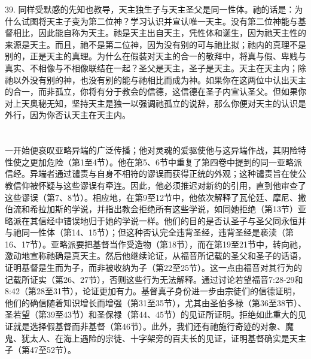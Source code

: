 39. 同样受默感的先知也教导，天主独生子与天主圣父是同一性体。祂的话是：为什么试图将天主子变为第二位神？学习认识并宣认唯一天主。没有第二位神能与基督相比，因此能自称为天主。祂是天主出自天主，凭性体和诞生，因为祂天主性的来源是天主。而且，祂不是第二位神，因为没有别的可与祂比拟；祂内的真理不是别的，正是天主的真理。为什么在假装对天主的合一的敬拜中，将真与假、卑贱与真实、不相像与不相像联结在一起？圣父是天主，圣子是天主。天主在天主内；除祂以外没有别的神，也没有别的能与祂相比而成为神。如果你在这两位中认出天主的合一，而非孤立，你将有分于教会的信德，这信德在圣子内宣认圣父。但如果你对上天奥秘无知，坚持天主是独一以强调祂孤立的说辞，那么你便对天主的认识是外行，因为你否认天主在天主内。\par



\section{}

一开始便哀叹亚略异端的广泛传播；他对灵魂的爱驱使他与这异端作战，其阴险特性使之更加危险（第1至4节）。他在第5、6节中重复了第四卷中提到的同一亚略派信经。异端者通过谴责与自身不相符的谬误而获得正统的外观；这种谴责旨在使公教信仰被怀疑与这些谬误有牵连。因此，他必须推迟对新约的引用，直到他审查了这些谬误（第7、8节）。相应地，在第9至12节中，他依次解释了瓦伦廷、摩尼、撒伯流和希拉加斯的学说，并指出教会拒绝所有这些学说，如同她拒绝（第13节）亚略派在其信经中错误地归于她的学说一样。他们的目的是否认圣子与圣父同永恒并与祂同一性体（第14、15节）；但这种否认完全违背圣经，违背圣经是亵渎（第16、17节）。亚略派要把基督当作受造物（第18节），而在第19至21节中，转向祂，激动地宣称祂确是真天主。然后他继续论证，从福音所记载的圣父和圣子的话语，证明基督是生而为子，而非被收纳为子（第22至25节）。这一点由福音对其行为的记载所证实（第26、27节），否则这些行为无法解释。通过讨论若望福音7:28-29和8:42（第28至31节），论证更加有力。基督真子身份进一步由宗徒们的信德证明，他们的确信随着知识增长而增强（第31至35节），尤其由圣伯多禄（第36至38节）、圣若望（第39至43节）和圣保禄（第44、45节）的见证所证明。拒绝如此重大的见证就是选择假基督而非基督（第46节）。此外，我们还有祂施行奇迹的对象、魔鬼、犹太人、在海上遇险的宗徒、十字架旁的百夫长的见证，证明基督确实是天主子（第47至52节）。\par

